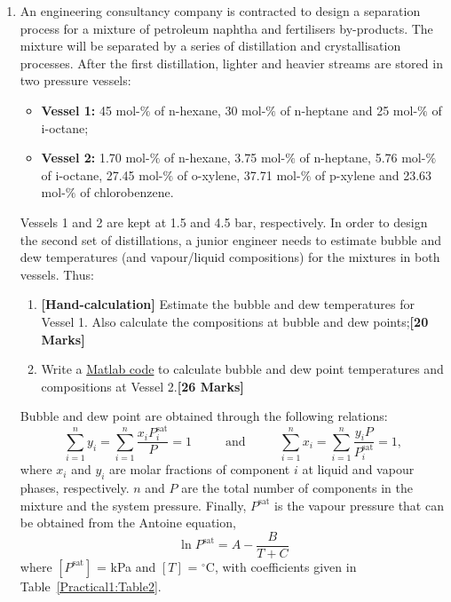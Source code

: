 \documentclass[12pts,a4paper,amsmath,amssymb,floatfix]{article}%
\newcommand{\frc}{\displaystyle\frac}
\begin{document}
\begin{enumerate}[label=\bfseries Problem \arabic*:]
     \item An engineering consultancy company is contracted to design a separation process for a mixture of petroleum naphtha and fertilisers by-products. The mixture will be separated by a series of distillation and crystallisation processes. After the first distillation, lighter and heavier streams are stored in two pressure vessels:
         \begin{itemize}
            \item {\bf Vessel 1:} 45 mol-$\%$ of n-hexane, 30 mol-$\%$ of n-heptane and 25 mol-$\%$ of i-octane;
            \item {\bf Vessel 2:} 1.70 mol-$\%$ of n-hexane, 3.75 mol-$\%$ of n-heptane, 5.76 mol-$\%$ of i-octane, 27.45 mol-$\%$ of o-xylene, 37.71 mol-$\%$ of p-xylene and 23.63 mol-$\%$ of chlorobenzene.
         \end{itemize} 
         Vessels 1 and 2 are kept at 1.5 and 4.5 bar, respectively. In order to design the second set of distillations, a junior engineer needs to estimate bubble and dew temperatures (and vapour/liquid compositions) for the mixtures in both vessels. Thus:   
          \begin{enumerate}[label=\bfseries Task \arabic*]
              \item\label{e} {\bf[Hand-calculation]} Estimate the bubble and dew temperatures for Vessel 1. Also calculate the compositions at bubble and dew points;\hfill{\bf[20 Marks]}
              \item\label{f} Write a \underline{Matlab code} to calculate bubble and dew point temperatures and compositions at Vessel 2.\hfill{\bf[26 Marks]}
          \end{enumerate}
          Bubble and dew point are obtained through the following relations:
          \begin{displaymath}
             \sum\limits_{i=1}^{n} y_{i} = \sum\limits_{i=1}^{n} \frc{x_{i}P_{i}^{\text{sat}}}{P} = 1 \hspace{1cm}\text{ and } \hspace{1cm} \sum\limits_{i=1}^{n} x_{i} = \sum\limits_{i=1}^{n} \frc{y_{i}P}{P_{i}^{\text{sat}}} = 1,
          \end{displaymath}
          where $x_{i}$ and $y_{i}$ are molar fractions of component $i$ at liquid and vapour phases, respectively. $n$ and $P$ are the total number of components in the mixture and the system pressure. Finally, $P^{\text{sat}}$ is the vapour pressure that can be obtained from the Antoine equation,
          \begin{displaymath}
            \ln{P^{\text{sat}}} = A - \frc{B}{T+C}
          \end{displaymath}
          where $\left[P^{\text{sat}}\right]$ = kPa and $[T]$ = $^{\circ}$C, with coefficients given in Table~\ref{Practical1:Table2}.
           


\end{enumerate}
\end{document}
